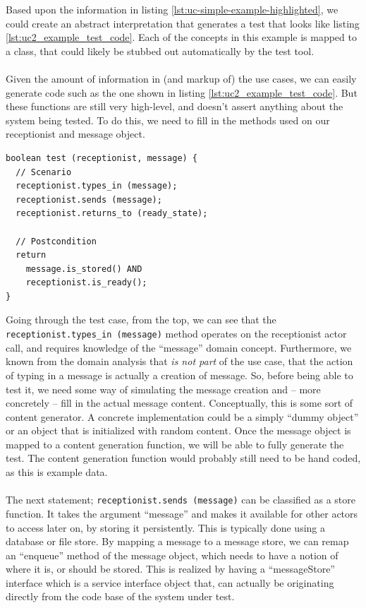 Based upon the information in listing \ref{lst:uc-simple-example-highlighted}, we could create an abstract interpretation that generates a test that looks like listing \ref{lst:uc2_example_test_code}.
Each of the concepts in this example is mapped to a class, that could likely be stubbed out automatically by the test tool.\\\\
Given the amount of information in (and markup of) the use cases, we can easily generate code such as the one shown in listing \ref{lst:uc2_example_test_code}. But these functions are still very high-level, and doesn't assert anything about the system being tested. To do this, we need to fill in the methods used on our receptionist and message object.
\begin{lstlisting}[caption=Generated test case,label={lst:uc2_example_test_code}]
boolean test (receptionist, message) {
  // Scenario
  receptionist.types_in (message);
  receptionist.sends (message);
  receptionist.returns_to (ready_state);
  
  // Postcondition
  return
    message.is_stored() AND
    receptionist.is_ready();
}
\end{lstlisting}
Going through the test case, from the top, we can see that the \texttt{receptionist.types\_in~(message)} method operates on the receptionist actor call, and requires knowledge of the ``message'' domain concept. Furthermore, we known from the domain analysis that \emph{is not part} of the use case, that the action of typing in a message is actually a creation of message. So, before being able to test it, we need some way of simulating the message creation and -- more concretely -- fill in the actual message content. Conceptually, this is some sort of content generator. A concrete implementation could be a simply ``dummy object'' or an object that is initialized with random content. Once the message object is mapped to a content generation function, we will be able to fully generate the test. The content generation function would probably still need to be hand coded, as this is example data.\\\\
The next statement; \texttt{receptionist.sends (message)} can be classified as a store function. It takes the argument ``message'' and makes it available for other actors to access later on, by storing it persistently. This is typically done using a database or file store. By mapping a message to a message store, we can remap an ``enqueue'' method of the message object, which needs to have a notion of where it is, or should be stored. This is realized by having a ``messageStore'' interface which is a service interface object that, can actually be originating directly from the code base of the system under test.\\\\
